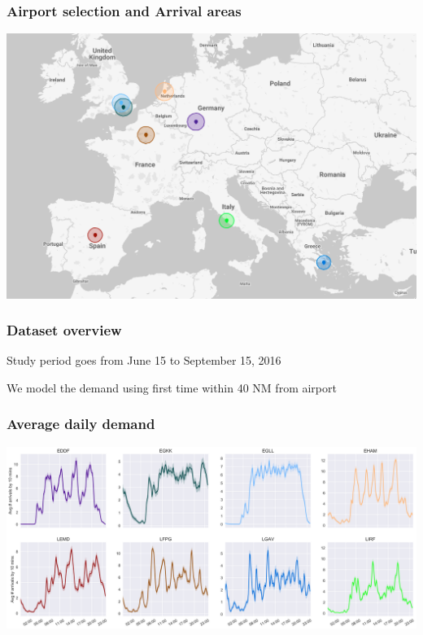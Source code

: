 \documentclass[table,aspectratio=169]{beamer}
\begin{document}
%
%

%
\begin{frame}[t]\frametitle{Airport selection and Arrival areas}
    \centering
    \includegraphics[width=.7\textwidth]{map}
\end{frame}

\begin{frame}[t]\frametitle{Dataset overview}
    \centering
    

    \vfill

    \alert{Study period} goes from June 15 to September 15, 2016

    \alert{We model the demand} using first time within 40 NM from airport
\end{frame}

\begin{frame}[t]\frametitle{Average daily demand}
    \centering
    \includegraphics[width=.9\textwidth]{AvgArrivals}
\end{frame}
\end{document}
